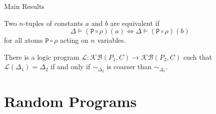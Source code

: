 \documentclass{beamer}
\begin{document}
\begin{frame}{Main Results}
  \begin{definition}[Equivalence]
    Two $n$-tuples of constants $a$ and $b$ are \alert{equivalent} if
    \[
      \Delta \vDash (\mathtt{P} \circ \rho)(a) \iff \Delta \vDash (\mathtt{P}
      \circ \rho)(b)
    \]
    for all atoms $\mathtt{P} \circ \rho$ acting on $n$ variables.
  \end{definition}
  \pause
  \begin{theorem}
    There is a logic program $\mathcal{L}\colon \mathcal{KB}(P_1, C) \to
    \mathcal{KB}(P_2, C)$ such that $\mathcal{L}(\Delta_1) = \Delta_2$ if and
    only if ${\sim_{\Delta_2}}$ is coarser than ${\sim_{\Delta_1}}$.
  \end{theorem}
\end{frame}

\section{Random Programs}
\end{document}
